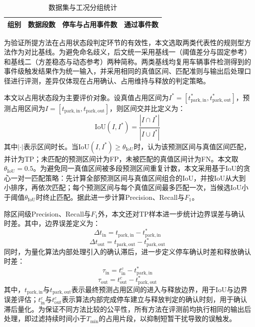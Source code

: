 \documentclass{xdupgthesis}
\providecommand{\FloatBarrier}{}
\begin{document}
{
    \setlength{\intextsep}{0.45\baselineskip}
\begin{table}[H]
    \centering
    \caption{数据集与工况分组统计}
    \label{tab:ch4_dataset}
    \setlength{\tabcolsep}{8pt}
    \begin{tabular}{c c c c}
        \toprule
        组别 & 数据段数 & 停车与占用事件数 & 通过事件数 \\
        \midrule
        
    \end{tabular}
\end{table}
}
\FloatBarrier

为验证所提方法在占用状态段判定环节的有效性，本文选取两类代表性的规则型方法作为对比基线。为避免命名歧义，后文统一采用基线一（阈值差分与固定参考）和基线二（方差稳态与动态参考）两种简称。两类基线均复用车辆事件检测得到的事件级触发结果作为统一输入，并采用相同的真值区间、匹配准则与输出后处理口径进行评测，差异仅体现在占用确认、占用维持与释放的判定策略。

本文以占用状态段为主要评价对象。设真值占用区间为$I^{*}=[t^{*}_{\mathrm{park,in}},t^{*}_{\mathrm{park,out}}]$，预测占用区间为$I=[t_{\mathrm{park,in}},t_{\mathrm{park,out}}]$，则区间交并比定义为：
\begin{equation}
    \mathrm{IoU}(I,I^{*})=\frac{|I\cap I^{*}|}{|I\cup I^{*}|}
\end{equation}
其中$|\cdot|$表示区间时长。当$\mathrm{IoU}(I,I^{*})\ge \theta_{\mathrm{IoU}}$时，认为该预测区间与真值区间匹配，并计为TP；未匹配的预测区间计为FP，未被匹配的真值区间计为FN。本文取$\theta_{\mathrm{IoU}}=0.5$。为避免同一真值区间被多段预测区间重复计数，本文采用基于IoU的贪心一对一匹配策略：先计算全部预测区间与真值区间组合的IoU，并按IoU从大到小排序，再依次匹配；每个预测区间与每个真值区间最多匹配一次，当候选IoU小于阈值$\theta_{\mathrm{IoU}}$时终止匹配。据此进一步计算Precision、Recall与$F_1$。

除区间级Precision、Recall与$F_1$外，本文还对TP样本进一步统计边界误差与确认时差。其中，边界误差定义为：
\begin{equation}
    \Delta t_{\mathrm{in}}=t_{\mathrm{park,in}}-t^{*}_{\mathrm{park,in}}
\end{equation}
\begin{equation}
    \Delta t_{\mathrm{out}}=t_{\mathrm{park,out}}-t^{*}_{\mathrm{park,out}}
\end{equation}
同时，为量化算法内部处理引入的确认滞后，进一步定义停车确认时差和释放确认时差：
\begin{equation}
    \tau_{\mathrm{in}}=t^{c}_{\mathrm{in}}-t^{*}_{\mathrm{park,in}}
\end{equation}
\begin{equation}
    \tau_{\mathrm{out}}=t^{c}_{\mathrm{out}}-t^{*}_{\mathrm{park,out}}
\end{equation}
其中，$t_{\mathrm{park,in}}$与$t_{\mathrm{park,out}}$表示最终预测占用区间的进入与释放边界，用于IoU与边界误差评估；$t^{c}_{\mathrm{in}}$与$t^{c}_{\mathrm{out}}$表示算法内部完成停车建立与释放判定的确认时刻，用于确认滞后量化。为保证不同方法比较的公平性，所有方法在评测前均执行相同的输出后处理，即过滤持续时间小于$T_{\min}$的占用片段，以抑制短暂干扰导致的误触发。
\end{document}
